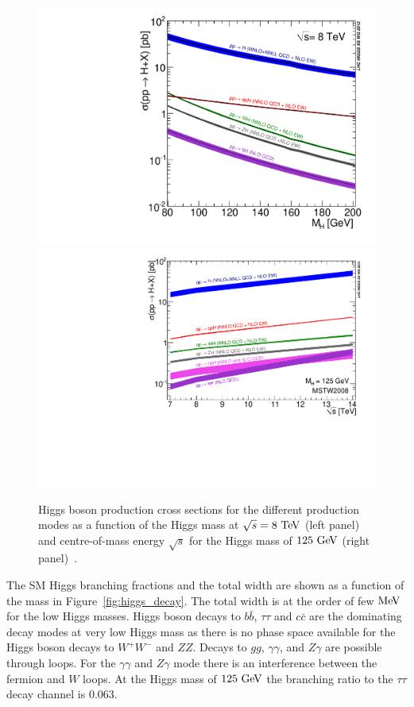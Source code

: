 \begin{figure}[ht]
\centering
\includegraphics[width=0.49\columnwidth]{figures_chapter2/Higgs_XS_8TeV_LM200}
\includegraphics[width=0.49\columnwidth]{figures_chapter2/7-14}
\caption{Higgs boson production cross sections for the different production modes as a function of the Higgs mass at $\sqrt{s}=8~\mathrm{Te\kern -0.1em V}$ (left panel) and centre-of-mass energy $\sqrt{s}$ for the Higgs mass of $125~\mathrm{Ge\kern -0.1em V}$ (right panel)~\cite{Dittmaier:2011ti,Dittmaier:2012vm,Heinemeyer:2013tqa}.}
\label{fig:higgs_cross}
\end{figure} 

The SM Higgs branching fractions and the total width are shown as a function of the mass in Figure~\ref{fig:higgs_decay}. The total width is at the order of few $\mathrm{Me\kern -0.1em V}$ for the low Higgs masses. Higgs boson decays to $b\bar{b}$, $\tau\tau$ and $c\bar{c}$ are the dominating decay modes at very low Higgs mass as there is no phase space available for the Higgs boson decays to $W^{+}W^{-}$ and $ZZ$. Decays to $gg$, $\gamma\gamma$, and $Z\gamma$ are possible through loops. For the $\gamma\gamma$ and $Z\gamma$ mode there is an interference between the fermion and $W$ loops.  At the Higgs mass of $125~\mathrm{Ge\kern -0.1em V}$ the branching ratio to the $\tau\tau$ decay channel is $0.063$.

